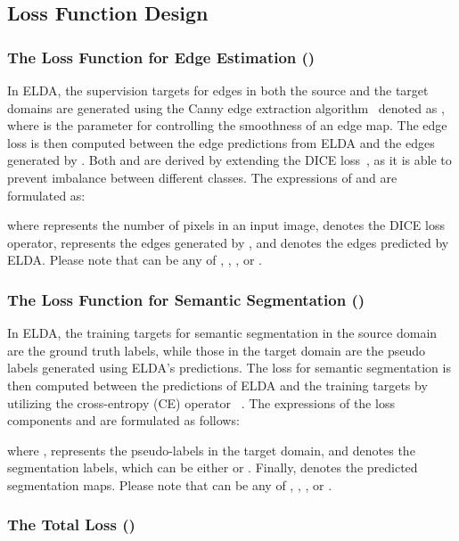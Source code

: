 \documentclass{bmvc2k}
\begin{document}
\subsection{Loss Function Design}
\label{subsec::loss_function}



\subsubsection{The Loss Function for Edge Estimation ()}

In ELDA, the supervision targets for edges in both the source and the target domains are generated using the Canny edge extraction algorithm~\cite{canny1986} denoted as , where  is the parameter for controlling the smoothness of an edge map. The edge loss  is then computed between the edge predictions from ELDA and the edges generated by . Both  and  are derived by extending the DICE loss~\cite{milletari2016vnet}, as it is able to prevent imbalance between different classes.
The expressions of  and  are formulated as:



where  represents the number of pixels in an input image,  denotes the DICE loss operator,  represents the edges generated by , and  denotes the edges predicted by ELDA. Please note that  can be any of  , , , or .




\subsubsection{The Loss Function for Semantic Segmentation ()}
In ELDA, the training targets for semantic segmentation in the source domain are the ground truth labels, while those in the target domain are the pseudo labels generated using ELDA's predictions. The loss for semantic segmentation  is then computed between the predictions of ELDA and the training targets by utilizing the cross-entropy (CE) operator ~\cite{DBLP:journals/corr/abs-1805-07836}. The expressions of the loss components  and  are formulated as follows:

where ,  represents the pseudo-labels in the target domain, and  denotes the segmentation labels, which can be either  or . Finally,  denotes the predicted segmentation maps. Please note that  can be any of , ,  , or .







\subsubsection{The Total Loss ()}
\end{document}
